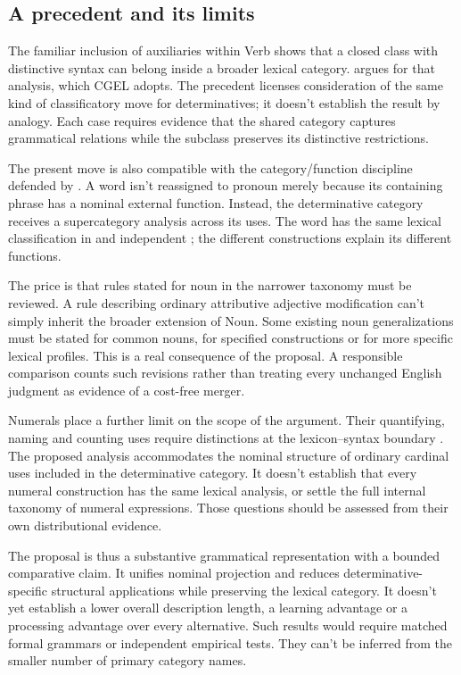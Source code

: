 \documentclass[12pt]{article}
\begin{document}
\subsection{A precedent and its limits}

The familiar inclusion of auxiliaries within Verb shows that a closed class with distinctive syntax can belong inside a broader lexical category. \textcite{pullumwilson1977} argues for that analysis, which CGEL adopts. The precedent licenses consideration of the same kind of classificatory move for determinatives; it doesn't establish the result by analogy. Each case requires evidence that the shared category captures grammatical relations while the subclass preserves its distinctive restrictions.

The present move is also compatible with the category/function discipline defended by \textcite{payne2010,pullummiller2022nps}. A word isn't reassigned to pronoun merely because its containing phrase has a nominal external function. Instead, the determinative category receives a supercategory analysis across its uses. The word  has the same lexical classification in  and independent ; the different constructions explain its different functions.

The price is that rules stated for noun in the narrower taxonomy must be reviewed. A rule describing ordinary attributive adjective modification can't simply inherit the broader extension of Noun. Some existing noun generalizations must be stated for common nouns, for specified constructions or for more specific lexical profiles. This is a real consequence of the proposal. A responsible comparison counts such revisions rather than treating every unchanged English judgment as evidence of a cost-free merger.

Numerals place a further limit on the scope of the argument. Their quantifying, naming and counting uses require distinctions at the lexicon--syntax boundary \citep{reynolds2026numerals}. The proposed analysis accommodates the nominal structure of ordinary cardinal uses included in the determinative category. It doesn't establish that every numeral construction has the same lexical analysis, or settle the full internal taxonomy of numeral expressions. Those questions should be assessed from their own distributional evidence.

The proposal is thus a substantive grammatical representation with a bounded comparative claim. It unifies nominal projection and reduces determinative-specific structural applications while preserving the lexical category. It doesn't yet establish a lower overall description length, a learning advantage or a processing advantage over every alternative. Such results would require matched formal grammars or independent empirical tests. They can't be inferred from the smaller number of primary category names.
\end{document}
